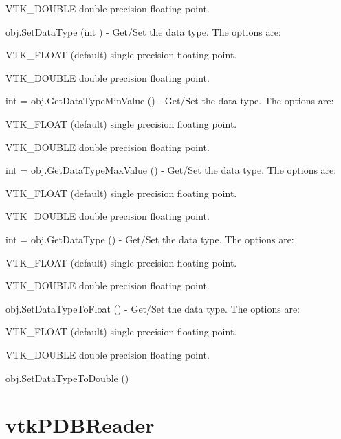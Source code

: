 \begin{DoxyItemize}
\begin{DoxyItemize}
\item V\-T\-K\-\_\-\-D\-O\-U\-B\-L\-E double precision floating point.  
\end{DoxyItemize}
\item {\ttfamily obj.\-Set\-Data\-Type (int )} -\/ Get/\-Set the data type. The options are\-:
\begin{DoxyItemize}
\item V\-T\-K\-\_\-\-F\-L\-O\-A\-T (default) single precision floating point.
\item V\-T\-K\-\_\-\-D\-O\-U\-B\-L\-E double precision floating point.  
\end{DoxyItemize}
\item {\ttfamily int = obj.\-Get\-Data\-Type\-Min\-Value ()} -\/ Get/\-Set the data type. The options are\-:
\begin{DoxyItemize}
\item V\-T\-K\-\_\-\-F\-L\-O\-A\-T (default) single precision floating point.
\item V\-T\-K\-\_\-\-D\-O\-U\-B\-L\-E double precision floating point.  
\end{DoxyItemize}
\item {\ttfamily int = obj.\-Get\-Data\-Type\-Max\-Value ()} -\/ Get/\-Set the data type. The options are\-:
\begin{DoxyItemize}
\item V\-T\-K\-\_\-\-F\-L\-O\-A\-T (default) single precision floating point.
\item V\-T\-K\-\_\-\-D\-O\-U\-B\-L\-E double precision floating point.  
\end{DoxyItemize}
\item {\ttfamily int = obj.\-Get\-Data\-Type ()} -\/ Get/\-Set the data type. The options are\-:
\begin{DoxyItemize}
\item V\-T\-K\-\_\-\-F\-L\-O\-A\-T (default) single precision floating point.
\item V\-T\-K\-\_\-\-D\-O\-U\-B\-L\-E double precision floating point.  
\end{DoxyItemize}
\item {\ttfamily obj.\-Set\-Data\-Type\-To\-Float ()} -\/ Get/\-Set the data type. The options are\-:
\begin{DoxyItemize}
\item V\-T\-K\-\_\-\-F\-L\-O\-A\-T (default) single precision floating point.
\item V\-T\-K\-\_\-\-D\-O\-U\-B\-L\-E double precision floating point.  
\end{DoxyItemize}
\item {\ttfamily obj.\-Set\-Data\-Type\-To\-Double ()}  
\end{DoxyItemize}\hypertarget{vtkio_vtkpdbreader}{}\section{vtk\-P\-D\-B\-Reader}\label{vtkio_vtkpdbreader}
